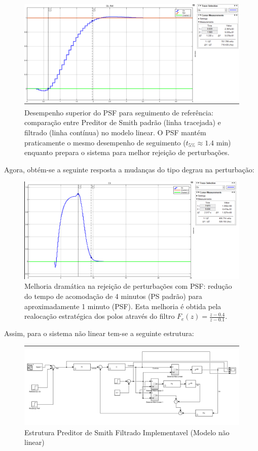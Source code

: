 \documentclass[a4paper,12pt]{article}
\begin{document}
\begin{figure}[H]
    \centering
    \includegraphics[width=0.9\linewidth]{image4.png}
    \caption{Desempenho superior do PSF para seguimento de referência: comparação entre Preditor de Smith padrão (linha tracejada) e filtrado (linha contínua) no modelo linear. O PSF mantém praticamente o mesmo desempenho de seguimento ($t_{5\%} \approx 1.4$ min) enquanto prepara o sistema para melhor rejeição de perturbações.}
    \label{fig:psf_step_response_ref}
\end{figure}

Agora, obtém-se a seguinte resposta a mudanças do tipo degrau na perturbação:

\begin{figure}[H]
    \centering
    \includegraphics[width=0.9\linewidth]{image5.png}
    \caption{Melhoria dramática na rejeição de perturbações com PSF: redução do tempo de acomodação de 4 minutos (PS padrão) para aproximadamente 1 minuto (PSF). Esta melhoria é obtida pela realocação estratégica dos polos através do filtro $F_e(z) = \frac{z-0.4}{z-0.1}$.}
    \label{fig:psf_step_response_disturbance}
\end{figure}

Assim, para o sistema não linear tem-se a seguinte estrutura:

\begin{figure}[H]
    \centering
    \includegraphics[width=0.9\linewidth]{image6.png}
    \caption{Estrutura Preditor de Smith Filtrado Implementavel (Modelo não linear)}
    \label{fig:psf_nonlinear_structure}
\end{figure}
\end{document}
